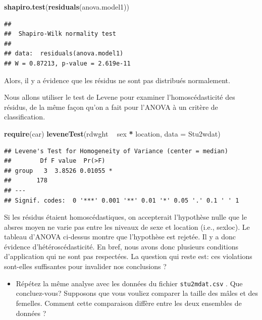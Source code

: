 \documentclass[12pt,]{book}
\newenvironment{Shaded}{\begin{snugshade}}{\end{snugshade}}
\newcommand{\DataTypeTok}[1]{\textcolor[rgb]{0.27,0.27,0.27}{#1}}
\newcommand{\KeywordTok}[1]{\textcolor[rgb]{0.27,0.27,0.27}{\textbf{#1}}}
\newcommand{\NormalTok}[1]{#1}
\newcommand{\OperatorTok}[1]{\textcolor[rgb]{0.43,0.43,0.43}{\textbf{#1}}}
\newcommand{\StringTok}[1]{\textcolor[rgb]{0.5,0.5,0.5}{#1}}
\providecommand{\tightlist}{%
  \setlength{\itemsep}{0pt}\setlength{\parskip}{0pt}}
\begin{document}
\begin{Shaded}
\begin{Highlighting}[]
\KeywordTok{shapiro.test}\NormalTok{(}\KeywordTok{residuals}\NormalTok{(anova.model1))}
\end{Highlighting}
\end{Shaded}

\begin{verbatim}
## 
## 	Shapiro-Wilk normality test
## 
## data:  residuals(anova.model1)
## W = 0.87213, p-value = 2.619e-11
\end{verbatim}

Alors, il y a évidence que les résidus ne sont pas distribués normalement.

Nous allons utiliser le test de Levene pour examiner l'homoscédasticité des résidus, de la même façon qu'on a fait pour l'ANOVA à un critère de classification.

\begin{Shaded}
\begin{Highlighting}[]
\KeywordTok{require}\NormalTok{(car)}
\KeywordTok{leveneTest}\NormalTok{(rdwght }\OperatorTok{~}\StringTok{ }\NormalTok{sex }\OperatorTok{*}\StringTok{ }\NormalTok{location, }\DataTypeTok{data =}\NormalTok{ Stu2wdat)}
\end{Highlighting}
\end{Shaded}

\begin{verbatim}
## Levene's Test for Homogeneity of Variance (center = median)
##        Df F value  Pr(>F)  
## group   3  3.8526 0.01055 *
##       178                  
## ---
## Signif. codes:  0 '***' 0.001 '**' 0.01 '*' 0.05 '.' 0.1 ' ' 1
\end{verbatim}

Si les résidus étaient homoscédastiques, on accepterait l'hypothèse nulle que le absres moyen ne varie pas entre les niveaux de sexe et location (i.e., sexloc). Le tableau d'ANOVA ci-dessus montre que l'hypothèse est rejetée. Il y a donc évidence d'hétéroscédasticité. En bref, nous avons donc plusieurs conditions d'application qui ne sont pas respectées. La question qui reste est: ces violations sont-elles suffisantes pour invalider nos conclusions ?

\begin{itemize}
\tightlist
\item
  Répétez la même analyse avec les données du fichier \texttt{stu2mdat.csv} . Que concluez-vous? Supposons que vous vouliez comparer la taille des mâles et des femelles. Comment cette comparaison diffère entre les deux ensembles de données ?
\end{itemize}
\end{document}
